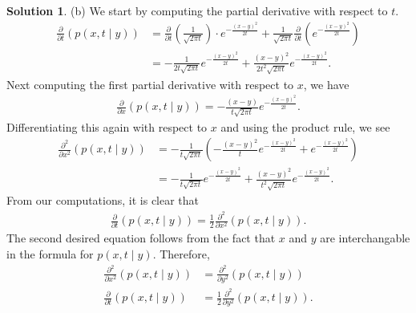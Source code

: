 \documentclass[12pt]{article}
\theoremstyle{definition}
\newtheorem{sol}{Solution}
\theoremstyle{remark}
\begin{document}
\begin{sol}
    (b) We start by computing the partial derivative with respect to $t$.
    \begin{align*}
        \frac{\partial }{\partial t} \left( p(x,t \mid y) \right) &=   \frac{\partial }{\partial t} \left( \frac{1}{\sqrt{2\pi t}} \right) \cdot e^{- \frac{(x-y)^{2}}{2t}} + \frac{1}{\sqrt{2\pi t}} \frac{\partial }{\partial t} \left(  e^{- \frac{(x-y)^{2}}{2t}}  \right)\\
                                                                  &= - \frac{1}{2t \sqrt{2\pi t}} e^{- \frac{(x-y)^{2}}{2t}} + \frac{(x-y)^{2}}{2t^{2}\sqrt{2\pi t}} e^{- \frac{(x-y)^{2}}{2t}}.
    \end{align*}
    Next computing the first partial derivative with respect to $x$, we have
    \begin{align*}
        \frac{\partial }{\partial x} \left( p(x,t \mid y) \right) = -\frac{(x-y)}{t\sqrt{2\pi t}} e^{- \frac{(x-y)^{2}}{2t}}.
    \end{align*}
    Differentiating this again with respect to $x$ and using the product rule, we see 
    \begin{align*}
        \frac{\partial^{2} }{\partial x^{2}} \left( p(x,t \mid y) \right) &= -\frac{1}{t\sqrt{2\pi t}}\left( -\frac{(x-y)^{2}}{t} e^{- \frac{(x-y)^{2}}{2t}} + e^{- \frac{(x-y)^{2}}{2t}} \right)\\
                                                                          &= - \frac{1}{t \sqrt{2\pi t}} e^{- \frac{(x-y)^{2}}{2t}} + \frac{(x-y)^{2}}{t^{2}\sqrt{2\pi t}} e^{- \frac{(x-y)^{2}}{2t}}.
    \end{align*}
    From our computations, it is clear that
    \begin{align*}
        \frac{\partial }{\partial t} \left( p(x,t \mid y) \right)  = \frac{1}{2}  \frac{\partial^{2} }{\partial x^{2}} \left( p(x,t \mid y) \right).
    \end{align*}
    The second desired equation follows from the fact that $x$ and $y$ are interchangable in the formula for $p(x,t\mid y)$. Therefore,
    \begin{align*}
        \frac{\partial^{2} }{\partial x^{2}} \left( p(x,t \mid y) \right) &= \frac{\partial^{2} }{\partial y^{2}} \left( p(x,t \mid y) \right)\\
        \frac{\partial }{\partial t} \left( p(x,t \mid y) \right)  &= \frac{1}{2}  \frac{\partial^{2} }{\partial y^{2}} \left( p(x,t \mid y) \right).
    \end{align*}

\end{sol}
\end{document}
